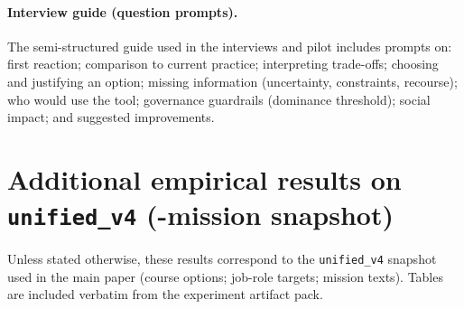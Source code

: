 \documentclass[sigconf,review]{acmart}
\begin{document}
\paragraph{Interview guide (question prompts).} The semi-structured guide used in the interviews and pilot includes prompts on: first reaction; comparison to current practice; interpreting trade-offs; choosing and justifying an option; missing information (uncertainty, constraints, recourse); who would use the tool; governance guardrails (dominance threshold); social impact; and suggested improvements.

\section{Additional empirical results on \texttt{unified\_v4} (\NumMissionsMain-mission snapshot)}
\label{sec:supp-results}
Unless stated otherwise, these results correspond to the \texttt{unified\_v4} snapshot used in the main paper (\NumCourses course options; \NumOccupations job-role targets; \NumMissionsMain mission texts). Tables are included verbatim from the experiment artifact pack.










\end{document}
